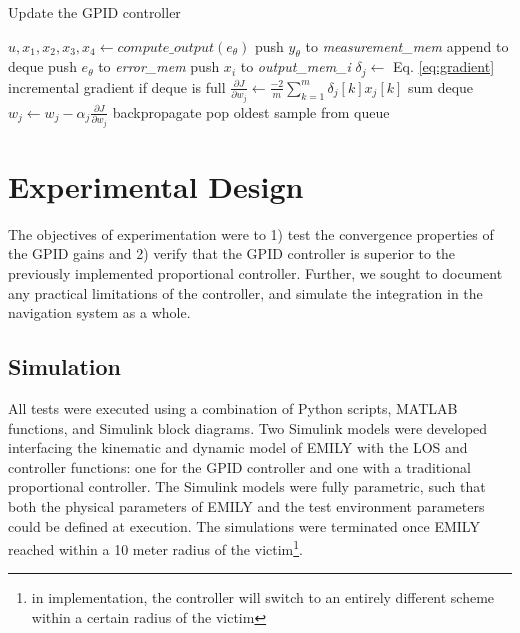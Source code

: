 \documentclass[conference]{IEEEtran}
\newcommand{\error}{e_\theta}
\newcommand{\measurement}{y_\theta}
\begin{document}
\begin{algorithm}[h]
\caption{Update the GPID controller}\label{alg:gpid_update}
\begin{algorithmic}[1]
\Function{Update-Controller}{$\error, \measurement, m$}
\State $u, x_1, x_2, x_3, x_4 \gets compute\_output(\error)$
\State push $\measurement$ to \textit{measurement\_mem} \Comment append to deque
\State push $\error$ to \textit{error\_mem}
\State push $x_i$ to \textit{output\_mem\_i}
\EndFor
{}
\State $\delta_j \gets$ Eq. \ref{eq:gradient} \Comment incremental gradient
\EndFor
\EndIf
{} \Comment if deque is full
\State $\frac{\partial J}{\partial w_j} \gets \frac{-2}{m} \sum\limits_{k=1}^m  \delta_j[k] x_j[k]$ \Comment sum deque
\State $w_j \gets w_j - \alpha_j \frac{\partial J}{\partial w_j}$ \Comment backpropagate
\EndFor
{}
\State pop oldest sample from queue
\EndFor
\EndIf
\State {}
\EndFunction
\end{algorithmic}
\end{algorithm}




\newpage
\section{Experimental Design} %
\label{sec:experimental_design}
The objectives of experimentation were to 1) test the convergence properties of the GPID gains and 2) verify that the GPID controller is superior to the previously implemented proportional controller. Further, we sought to document any practical limitations of the controller, and simulate the integration in the navigation system as a whole.

\subsection{Simulation} %
\label{sub:simulation}
All tests were executed using a combination of Python scripts, MATLAB functions, and Simulink block diagrams. Two Simulink models were developed interfacing the kinematic and dynamic model of EMILY with the LOS and controller functions: one for the GPID controller and one with a traditional proportional controller. The Simulink models were fully parametric, such that both the physical parameters of EMILY and the test environment parameters could be defined at execution. The simulations were terminated once EMILY reached within a 10 meter radius of the victim\footnote{in implementation, the controller will switch to an entirely different scheme within a certain radius of the victim}. 
\end{document}
